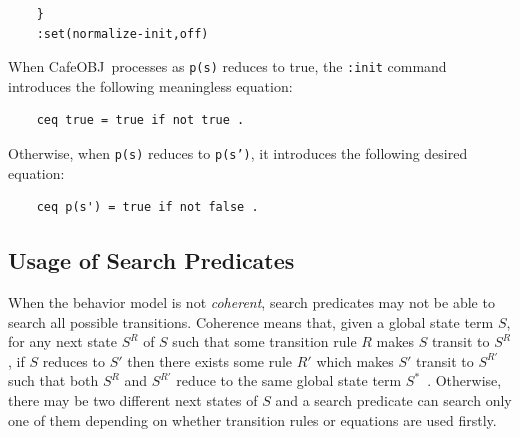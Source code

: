 \documentclass[12pt]{report}
\newcommand{\stt}[1]{{\small{\tt {#1}}}}
\newcommand{\cafeobj}{{\sf CafeOBJ}~}
\begin{document}
\begin{enumerate}
\begin{verbatim}
    }
    :set(normalize-init,off)
  \end{verbatim}\vspace{-0.6cm}
  When \cafeobj processes as \stt{p(s)} reduces to true, the \stt{:init}
  command introduces the following meaningless equation:
  \begin{verbatim}
    ceq true = true if not true .
  \end{verbatim}\vspace{-0.6cm}
  Otherwise, when \stt{p(s)} reduces to \stt{p(s')}, it introduces the
  following desired equation:
  \begin{verbatim}
    ceq p(s') = true if not false .
  \end{verbatim}
\end{enumerate}

\subsection{Usage of Search Predicates}
When the behavior model is not {\it coherent}, search predicates may
not be able to search all possible transitions.  Coherence means that,
given a global state term $S$\!, for any next state $S^R$ of $S$ such
that some transition rule $R$ makes $S$ transit to $S^R$, if $S$
reduces to $S'$ then there exists some rule $R'$ which makes $S'$
transit to $S^{R'}$ such that both $S^R$ and $S^{R'}$ reduce to the
same global state term $S^*$~\cite{Maude14}.  Otherwise, there may be
two different next states of $S$ and a search predicate can search
only one of them depending on whether transition rules or equations
are used firstly.
\end{document}

